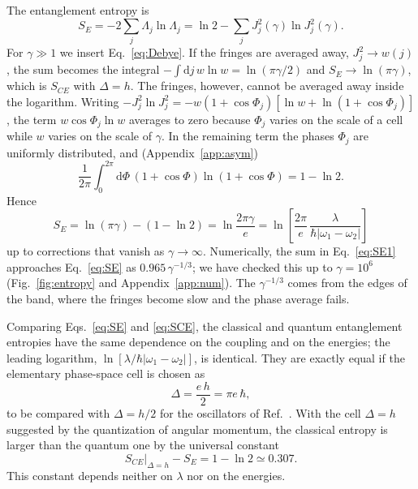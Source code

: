 \documentclass[aps,preprint,12pt,superscriptaddress,nofootinbib]{revtex4-2}
\newcommand{\dd}{\mathrm{d}}
\begin{document}
The entanglement entropy is
\begin{equation}
S_{E}=-2\sum_{j}\Lambda_{j}\ln\Lambda_{j}
=\ln2-\sum_{j}J_{j}^{2}(\gamma)\ln J_{j}^{2}(\gamma).
\label{eq:SE1}
\end{equation}
For $\gamma\gg1$ we insert Eq.~\eqref{eq:Debye}. If the fringes are averaged away,
$J_{j}^{2}\to w(j)$, the sum becomes the integral
$-\int\dd j\,w\ln w=\ln(\pi\gamma/2)$ and $S_{E}\to\ln(\pi\gamma)$, which is
$S_{CE}$ with $\Delta=h$. The fringes, however, cannot be averaged away inside the
logarithm. Writing
$-J_{j}^{2}\ln J_{j}^{2}=-w(1+\cos\Phi_{j})[\ln w+\ln(1+\cos\Phi_{j})]$, the term
$w\cos\Phi_{j}\ln w$ averages to zero because $\Phi_{j}$ varies on the scale of a
cell while $w$ varies on the scale of $\gamma$. In the remaining term the phases
$\Phi_{j}$ are uniformly distributed, and (Appendix~\ref{app:asym})
\begin{equation}
\frac{1}{2\pi}\int_{0}^{2\pi}\dd\Phi\,(1+\cos\Phi)\ln(1+\cos\Phi)=1-\ln2 .
\label{eq:phaseavg}
\end{equation}
Hence
\begin{equation}
\boxed{\;S_{E}=\ln(\pi\gamma)-(1-\ln2)=\ln\frac{2\pi\gamma}{e}
=\ln\left[\frac{2\pi}{e}\,\frac{\lambda}{\hbar|\omega_{1}-\omega_{2}|}\right]\;}
\label{eq:SE}
\end{equation}
up to corrections that vanish as $\gamma\to\infty$. Numerically, the sum in
Eq.~\eqref{eq:SE1} approaches Eq.~\eqref{eq:SE} as $0.965\,\gamma^{-1/3}$; we have
checked this up to $\gamma=10^{6}$ (Fig.~\ref{fig:entropy} and
Appendix~\ref{app:num}). The $\gamma^{-1/3}$ comes from the edges of the band, where
the fringes become slow and the phase average fails.

Comparing Eqs.~\eqref{eq:SE} and \eqref{eq:SCE}, the classical and quantum
entanglement entropies have the same dependence on the coupling and on the
energies; the leading logarithm, $\ln[\lambda/\hbar|\omega_{1}-\omega_{2}|]$, is
identical. They are exactly equal if the elementary phase-space cell is chosen as
\begin{equation}
\Delta=\frac{e\,h}{2}=\pi e\,\hbar ,
\label{eq:Delta}
\end{equation}
to be compared with $\Delta=h/2$ for the oscillators of Ref.~\cite{DKS}. With the cell
$\Delta=h$ suggested by the quantization of angular momentum, the classical entropy
is larger than the quantum one by the universal constant
\begin{equation}
S_{CE}\big|_{\Delta=h}-S_{E}=1-\ln2\simeq0.307 .
\label{eq:deficit}
\end{equation}
This constant depends neither on $\lambda$ nor on the energies.
\end{document}
